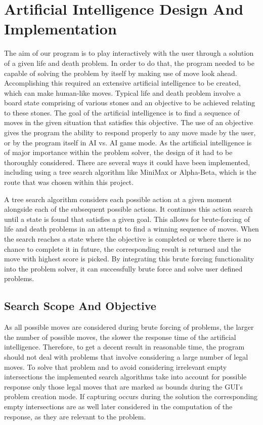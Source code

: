 \documentclass{l3proj}
\begin{document}
\section{Artificial Intelligence Design And Implementation}

The aim of our program is to play interactively with the user through a solution of a given life and death problem. In order to do that, the program needed to be capable of solving the problem by itself by making use of move look ahead. Accomplishing this required an extensive artificial intelligence to be created, which can make human-like moves. Typical life and death problem involve a board state comprising of various stones and an objective to be achieved relating to these stones. The goal of the artificial intelligence is to find a sequence of moves in the given situation that satisfies this objective. The use of an objective gives the program the ability to respond properly to any move made by the user, or by the program itself in AI vs. AI game mode. As the artificial intelligence is of major importance within the problem solver, the design of it had to be thoroughly considered. There are several ways it could have been implemented, including using a tree search algorithm like MiniMax or Alpha-Beta, which is the route that was chosen within this project.
 
A tree search algorithm considers each possible action at a given moment alongside each of the subsequent possible actions. It continues this action search until a state is found that satisfies a given goal. This allows for brute-forcing of life and death problems in an attempt to find a winning sequence of moves. When the search reaches a state where the objective is completed or where there is no chance to complete it in future, the corresponding result is returned and the move with highest score is picked. By integrating this brute forcing functionality into the problem solver, it can successfully brute force and solve user defined problems.

\subsection{Search Scope And Objective}\label{search_scope_objective}

As all possible moves are considered during brute forcing of problems, the larger the number of possible moves, the slower the response time of the artificial intelligence. Therefore, to get a decent result in reasonable time, the program should not deal with problems that involve considering a large number of legal moves. To solve that problem and to avoid considering irrelevant empty intersections the implemented search algorithms take into account for possible response only those legal moves that are marked as bounds during the GUI's problem creation mode. If capturing occurs during the solution the corresponding empty intersections are as well later considered in the computation of the response, as they are relevant to the problem.
\end{document}
